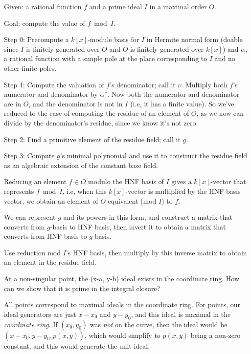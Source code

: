 \begin{mdframed}[backgroundcolor=yellow!20]
Given: a rational function $f$ and a prime ideal $I$ in a maximal order $O$.

Goal: compute the value of $f \bmod I$.

Step 0: Precompute a $k[x]$-module basis for $I$ in Hermite normal form (doable since $I$ is finitely generated over $O$ and $O$ is finitely generated over $k[x]$) and $\alpha$, a rational function with a simple pole at the place corresponding to $I$ and no other finite poles.

Step 1: Compute the valuation of $f$'s denominator; call it $\nu$.  Multiply both $f$'s numerator and denominator by $\alpha^\nu$.  Now both the numerator and denominator are in $O$, and the denominator is not in $I$ (i.e, it has a finite value).  So we've reduced to the case of computing the residue of an element of $O$, as we now can divide by the denominator's residue, since we know it's not zero.

Step 2: Find a primitive element of the residue field; call it $g$.

Step 3: Compute $g$'s minimal polynomial and use it to construct the residue field as an algebraic extension of the constant base field.

Reducing an element $f \in O$ modulo the HNF basis of $I$ gives a $k[x]$-vector that represents $f \bmod I$, i.e, when this $k[x]$-vector is multiplied by the HNF basis vector, we obtain an element of $O$ equivalent (mod $I$) to $f$.

We can represent $g$ and its powers in this form, and construct a matrix that converts from $g$-basis to HNF basis, then invert it to obtain a matrix that converts from HNF basis to $g$-basis.

Use reduction mod $I$'s HNF basis, then multiply by this inverse matrix to obtain an element in the residue field.
\end{mdframed}

At a non-singular point, the (x-a, y-b) ideal exists in the coordinate ring.  How can we
show that it is prime in the integral closure?

All points correspond to maximal ideals in the coordinate ring.
For points, our ideal generators are just $x-x_0$ and $y-y_0$, and this ideal is maximal in the {\it coordinate ring}.
If $(x_0, y_0)$ was {\it not} on the curve, then the ideal would be $(x-x_0, y-y_0, p(x,y))$, which
would simplify to $p(x,y)$ being a non-zero constant, and this would generate the unit ideal.

